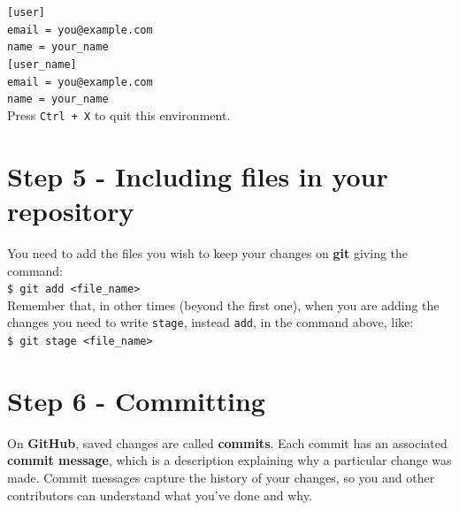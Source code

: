 \documentclass[12pt,a4paper,titlepage,brazil]{article}
\begin{document}
{\texttt{[user]}\\

\hspace{0.5cm}\texttt{email = you@example.com}\\

\hspace{0.5cm}\texttt{name = your\_name}\\

\texttt{[user\_name]}\\

\hspace{0.5cm}\texttt{email = you@example.com}\\

\hspace{0.5cm}\texttt{name = your\_name}\\

Press \texttt{Ctrl + X} to quit this environment.


\section{Step 5 - Including files in your repository}

You need to add the files you wish to keep your changes on {\bf git} giving the command:\\

\texttt{\$ git add <file\_name>}\\

Remember that, in other times (beyond the first one), when you are adding the changes you need to write \texttt{stage}, instead \texttt{add}, in the command above, like:\\

\texttt{\$ git stage <file\_name>}


\section{Step 6 - Committing}

On {\bf GitHub}, saved changes are called {\bf commits}. Each commit has an associated {\bf commit message}, which is a description explaining why a particular change was made. Commit messages capture the history of your changes, so you and other contributors can understand what you’ve done and why.\\

}
\end{document}
